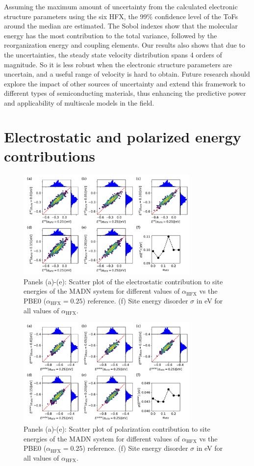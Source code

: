 \documentclass[%
 reprint,
superscriptaddress,
 amsmath,amssymb,
 aps,
prb,
floatfix
]{revtex4-2}
\newcommand{\ahfx}{\ensuremath{\alpha_\text{HFX}}\xspace}
\begin{document}
Assuming the maximum amount of uncertainty from the calculated electronic structure parameters using the six HFX, the 99\% confidence level of the ToFs around the median are estimated. The Sobol indexes show that the molecular energy has the most contribution to the total variance, followed by the reorganization energy and coupling elements. Our results also shows that due to the uncertainties, the steady state velocity distribution spans 4 orders of magnitude. So it is less robust when
the electronic structure parameters are uncertain, and a useful range of velocity is hard to obtain. Future research should explore the impact of other sources of uncertainty and extend this framework to different types of semiconducting materials, thus enhancing the predictive power and applicability of multiscale models in the field.




\appendix*
\section{Electrostatic and polarized energy contributions}
\begin{figure}
  \centering
  \includegraphics[width=0.80\textwidth]{figs/scatterEstat_qmmm.pdf}
  \caption{Panels (a)-(e): Scatter plot of the electrostatic contribution to site energies of the MADN system for different values of \ahfx vs the PBE0 ($\ahfx=0.25$) reference. (f) Site energy disorder $\sigma$ in \unit[]{eV} for all values of \ahfx.}
  \label{fig:Estat_qmmm_MADN}
\end{figure}

\begin{figure}
  \centering
  \includegraphics[width=0.80\textwidth]{figs/scatterEdip_qmmm.pdf}
  \caption{Panels (a)-(e): Scatter plot of polarization contribution to site energies of the MADN system for different values of \ahfx vs the PBE0 ($\ahfx=0.25$) reference. (f) Site energy disorder $\sigma$ in \unit[]{eV} for all values of \ahfx.}
  \label{fig:Edip_qmmm_MADN}
\end{figure}
\end{document}
